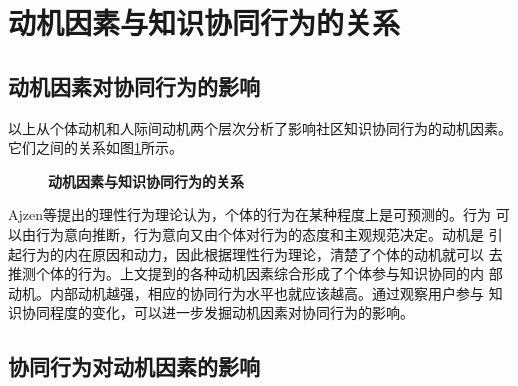 \section{动机因素与知识协同行为的关系}
  
\subsection{动机因素对协同行为的影响}

以上从个体动机和人际间动机两个层次分析了影响社区知识协同行为的动机因素。
它们之间的关系如图\ref{fig:motivation}所示。
\begin{figure}[!htb]
 
    \centering
    \caption{\small{\textbf{动机因素与知识协同行为的关系}}}
  \label{fig:motivation}
  \end{figure}

Ajzen等提出的理性行为理论认为，个体的行为在某种程度上是可预测的。行为
可以由行为意向推断，行为意向又由个体对行为的态度和主观规范决定。动机是
引起行为的内在原因和动力，因此根据理性行为理论，清楚了个体的动机就可以
去推测个体的行为。上文提到的各种动机因素综合形成了个体参与知识协同的内
部动机。内部动机越强，相应的协同行为水平也就应该越高。通过观察用户参与
知识协同程度的变化，可以进一步发掘动机因素对协同行为的影响。

\subsection{协同行为对动机因素的影响}
 
